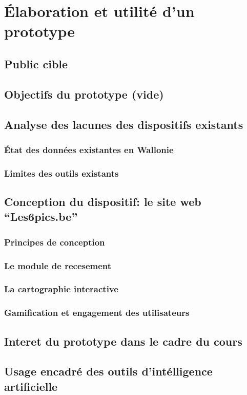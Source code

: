 \chapter{Élaboration et utilité d'un prototype}

\section{Public cible}

\section{Objectifs du prototype (vide)}

\section{Analyse des lacunes des dispositifs existants}

\subsection{État des données existantes en Wallonie}

\subsection{Limites des outils existants}

\section{Conception du dispositif: le site web \enquote{Les6pics.be}}

\subsection{Principes de conception}

\subsection{Le module de recesement}

\subsection{La cartographie interactive}

\subsection{Gamification et engagement des utilisateurs}

\section{Interet du prototype dans le cadre du cours}

\section{Usage encadré des outils d'intélligence artificielle}